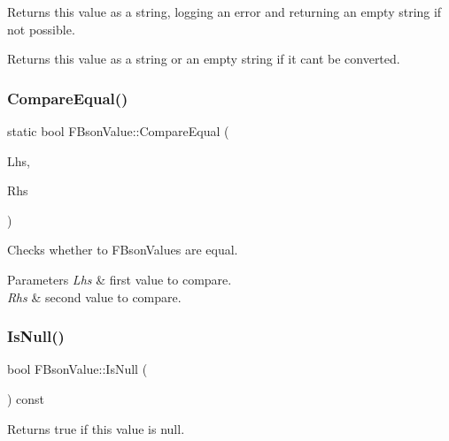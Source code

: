 Returns this value as a string, logging an error and returning an empty string if not possible.

\begin{DoxyReturn}{Returns}
this value as a string or an empty string if it can\textquotesingle{}t be converted. 
\end{DoxyReturn}
\mbox{\label{class_f_bson_value_a979a25eef93a5f0398ecc372518a5c43}} 
\subsubsection{\texorpdfstring{Compare\+Equal()}{CompareEqual()}}
{\footnotesize\ttfamily static bool F\+Bson\+Value\+::\+Compare\+Equal (\begin{DoxyParamCaption}\item[{const \mbox{\hyperlink{class_f_bson_value}{F\+Bson\+Value}} \&}]{Lhs,  }\item[{const \mbox{\hyperlink{class_f_bson_value}{F\+Bson\+Value}} \&}]{Rhs }\end{DoxyParamCaption})\hspace{0.3cm}{\ttfamily [static]}}

Checks whether to F\+Bson\+Values are equal.


\begin{DoxyParams}{Parameters}
{\em Lhs} & first value to compare. \\
\hline
{\em Rhs} & second value to compare. \\
\hline
\end{DoxyParams}
\mbox{\label{class_f_bson_value_a7f0281058bede8cfa8c7d8b4504d1995}} 
\subsubsection{\texorpdfstring{Is\+Null()}{IsNull()}}
{\footnotesize\ttfamily bool F\+Bson\+Value\+::\+Is\+Null (\begin{DoxyParamCaption}{ }\end{DoxyParamCaption}) const\hspace{0.3cm}{\ttfamily [inline]}}

\begin{DoxyReturn}{Returns}
true if this value is \textquotesingle{}null\textquotesingle{}. 
\end{DoxyReturn}
\mbox{\label{class_f_bson_value_a245c10ded56b07a03099b71556d29073}} 
